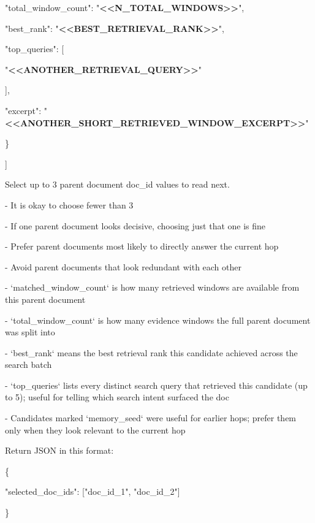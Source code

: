 \begin{tcolorbox}
\begin{scriptsize}
    "total\_window\_count": "\textcolor{my-green}{\textbf{\textless{}\textless{}N\_TOTAL\_WINDOWS\textgreater{}\textgreater{}}}",\par
    "best\_rank": "\textcolor{my-green}{\textbf{\textless{}\textless{}BEST\_RETRIEVAL\_RANK\textgreater{}\textgreater{}}}",\par
    "top\_queries": [\par
      "\textcolor{my-green}{\textbf{\textless{}\textless{}ANOTHER\_RETRIEVAL\_QUERY\textgreater{}\textgreater{}}}"\par
    ],\par
    "excerpt": "\textcolor{my-green}{\textbf{\textless{}\textless{}ANOTHER\_SHORT\_RETRIEVED\_WINDOW\_EXCERPT\textgreater{}\textgreater{}}}"\par
  \}\par
]\par
\mbox{}\par
Select up to 3 parent document doc\_id values to read next.\par
- It is okay to choose fewer than 3\par
- If one parent document looks decisive, choosing just that one is fine\par
- Prefer parent documents most likely to directly answer the current hop\par
- Avoid parent documents that look redundant with each other\par
- `matched\_window\_count` is how many retrieved windows are available from this parent document\par
- `total\_window\_count` is how many evidence windows the full parent document was split into\par
- `best\_rank` means the best retrieval rank this candidate achieved across the search batch\par
- `top\_queries` lists every distinct search query that retrieved this candidate (up to 5); useful for telling which search intent surfaced the doc\par
- Candidates marked `memory\_seed` were useful for earlier hops; prefer them only when they look relevant to the current hop\par
\mbox{}\par
Return JSON in this format:\par
\{\par
  "selected\_doc\_ids": ["doc\_id\_1", "doc\_id\_2"]\par
\}\par
\mbox{}\par

\end{scriptsize}
\end{tcolorbox}
